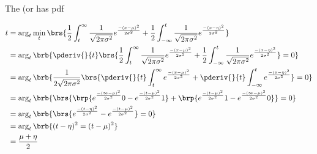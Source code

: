 \begin{example}
The  (or  has pdf

\begin{align*}
  t
    &= \arg_t \min_t
       \brs{
       \frac{1}{2}\int_t^\infty    \frac{1}{\sqrt{2\pi\sigma^2}}e^{\frac{-(x-\mu)^2}{2\sigma^2}} +
       \frac{1}{2}\int_{-\infty}^t \frac{1}{\sqrt{2\pi\sigma^2}}e^{\frac{-(x-\eta)^2}{2\sigma^2}}
       }
  \\&= \arg_t \brb{\pderiv{}{t}
       \brs{
       \frac{1}{2}\int_t^\infty    \frac{1}{\sqrt{2\pi\sigma^2}}e^{\frac{-(x-\mu)^2}{2\sigma^2}} +
       \frac{1}{2}\int_{-\infty}^t \frac{1}{\sqrt{2\pi\sigma^2}}e^{\frac{-(x-\eta)^2}{2\sigma^2}}
       }=0}
  \\&= \arg_t \brb{\frac{1}{2\sqrt{2\pi\sigma^2}}
       \brs{
       \pderiv{}{t}\int_t^\infty    e^{\frac{-(x-\mu)^2}{2\sigma^2}} +
       \pderiv{}{t}\int_{-\infty}^t e^{\frac{-(x-\eta)^2}{2\sigma^2}}
       }=0}
  \\&= \arg_t \brb{
       \brs{
       \brp{e^{\frac{-(\infty-\mu)^2}{2\sigma^2}}0 - e^{\frac{-(t-\mu)^2}{2\sigma^2}}1} +
       \brp{e^{\frac{-(t-\mu)^2}{2\sigma^2}}1 - e^{\frac{-(\infty-\mu)^2}{2\sigma^2}}0}
       }=0}
  \\&= \arg_t \brb{
       \brs{e^{\frac{-(t-\eta)^2}{2\sigma^2}}- e^{\frac{-(t-\mu)^2}{2\sigma^2}}}=0}
  \\&= \arg_t \brb{(t-\eta)^2=(t-\mu)^2}
  \\&= \frac{\mu+\eta}{2}
\end{align*}
\end{example}

\begin{example}
\label{prop:prob_gaussian_xy}
\end{example}


